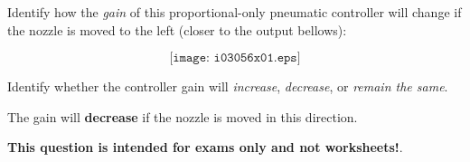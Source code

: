 

Identify how the {\it gain} of this proportional-only pneumatic controller will change if the nozzle is moved to the left (closer to the output bellows):

$$\texttt{[image: i03056x01.eps]}$$

Identify whether the controller gain will {\it increase}, {\it decrease}, or {\it remain the same}.

\vskip 30pt







The gain will {\bf decrease} if the nozzle is moved in this direction.







{\bf This question is intended for exams only and not worksheets!}.




